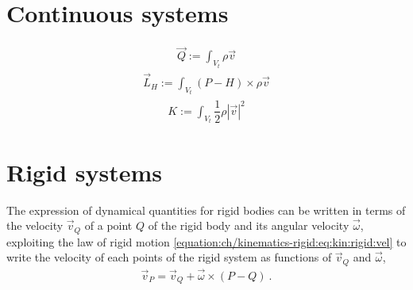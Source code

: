 \documentclass[letterpaper,10pt,english]{jupyterBook}
\begin{document}
\section{Continuous systems}
\label{\detokenize{ch/inertia:continuous-systems}}
\sphinxAtStartPar
{}
\begin{equation*}
\begin{split}\vec{Q} := \int_{V_t} \rho \vec{v} \end{split}
\end{equation*}
\sphinxAtStartPar
{}
\begin{equation*}
\begin{split}\vec{L}_H := \int_{V_t} (P - H) \times \rho \vec{v} \end{split}
\end{equation*}
\sphinxAtStartPar
{}
\begin{equation*}
\begin{split}K := \int_{V_t} \dfrac{1}{2} \rho |\vec{v}|^2\end{split}
\end{equation*}

\section{Rigid systems}
\label{\detokenize{ch/inertia:rigid-systems}}
\sphinxAtStartPar
The expression of dynamical quantities for rigid bodies can be written in terms of the velocity \(\vec{v}_Q\) of a point \(Q\) of the rigid body and its angular velocity \(\vec{\omega}\), exploiting the law of rigid motion \eqref{equation:ch/kinematics-rigid:eq:kin:rigid:vel} to write the velocity of each points of the rigid system as functions of \(\vec{v}_Q\) and \(\vec{\omega}\),
\begin{equation*}
\begin{split}\vec{v}_P = \vec{v}_Q + \vec{\omega} \times (P - Q) \ .\end{split}
\end{equation*}
\end{document}
